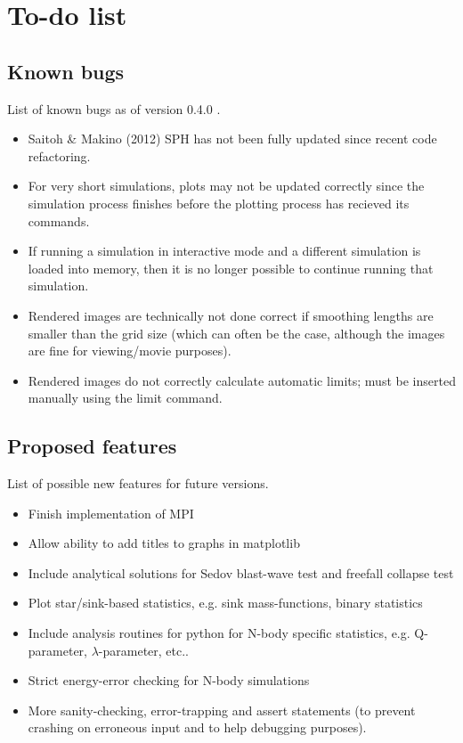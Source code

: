 \documentclass[a4paper]{article}
\newcommand{\VERNO}{0.4.0 }
\begin{document}
\newpage


\section{To-do list}

\subsection{Known bugs}
List of known bugs as of version \VERNO.

\begin{itemize}
\item Saitoh \& Makino (2012) SPH has not been fully updated since recent code refactoring.
\item For very short simulations, plots may not be updated correctly since the simulation process finishes before the plotting process has recieved its commands.
\item If running a simulation in interactive mode and a different simulation is loaded into memory, then it is no longer possible to continue running that simulation.
\item Rendered images are technically not done correct if smoothing lengths are smaller than the grid size (which can often be the case, although the images are fine for viewing/movie purposes).
\item Rendered images do not correctly calculate automatic limits; must be inserted manually using the limit command.
\end{itemize}


\subsection{Proposed features}
List of possible new features for future versions.

\begin{itemize}
\item Finish implementation of MPI
\item Allow ability to add titles to graphs in matplotlib
\item Include analytical solutions for Sedov blast-wave test and freefall collapse test
\item Plot star/sink-based statistics, e.g. sink mass-functions, binary statistics
\item Include analysis routines for python for N-body specific statistics, e.g. Q-parameter, $\lambda$-parameter, etc..
\item Strict energy-error checking for N-body simulations
\item More sanity-checking, error-trapping and assert statements (to prevent crashing on erroneous input and to help debugging purposes).
\end{itemize}
\end{document}
